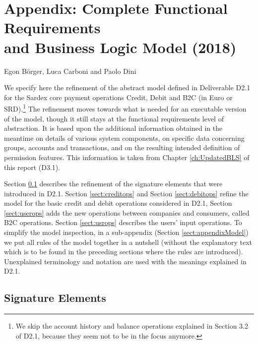 \chapter*{Appendix: Complete Functional Requirements\\ and Business Logic Model (2018)}
\label{appendix}

\vspace{-1cm}
\begin{center}
Egon B\"orger, Luca Carboni and Paolo Dini
\end{center}

We specify here the refinement of the abstract model defined in Deliverable D2.1 \cite{INTERLACE_D21} for the Sardex core payment operations Credit, Debit and B2C (in Euro or SRD).\footnote{We skip the account history and balance operations explained in Section 3.2 of D2.1, because they seem not to be in the focus anymore.} The refinement moves towards what is needed for an executable version of the model, though it still stays at the functional requirements level of abstraction. It is based upon the additional information obtained in the meantime on details of various system components, on specific data concerning groups, accounts and transactions, and on the resulting intended definition of permission features. This information is taken from Chapter \ref{ch:UpdatedBLS} of this report (D3.1).

Section \ref{sect:signature} describes the refinement of the signature elements that were introduced in D2.1. Section \ref{sect:creditops} and Section \ref{sect:debitops} refine the model for the basic credit and debit operations considered in D2.1,  Section \ref{sect:userops} adds the new operations between companies and consumers, called B2C operations. Section \ref{sect:usrops} describes the users' input operations. To simplify the model inspection, in a sub-appendix (Section \ref{sect:appendixModel}) we put all rules of the model together in a nutshell (without the explanatory text which is to be found in the preceding sections where the rules are introduced).  Unexplained terminology and notation are used with the meanings explained in D2.1.

\section{Signature Elements}
\label{sect:signature}

